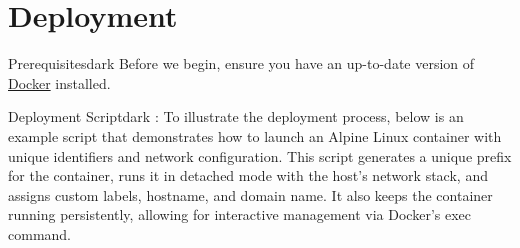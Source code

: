 \section{Deployment}
\label{Prerequisites}
\begin{baseBoxThree}{Prerequisites}{dark}
    Before we begin, ensure you have an up-to-date version of \href{https://docs.docker.com/get-docker/}{Docker} installed.
\end{baseBoxThree}

\label{Deployment Script}
\begin{baseBoxThree}{Deployment Script}{dark}
    \bigskip
    : To illustrate the deployment process, below is an example script that demonstrates how to launch an Alpine Linux container with unique identifiers and network configuration.
    This script generates a unique prefix for the container, runs it in detached mode with the host's network stack, and assigns custom labels, hostname, and domain name. It also keeps the container running persistently, allowing for interactive management via Docker's exec command.
    \bigskip


\end{baseBoxThree}
